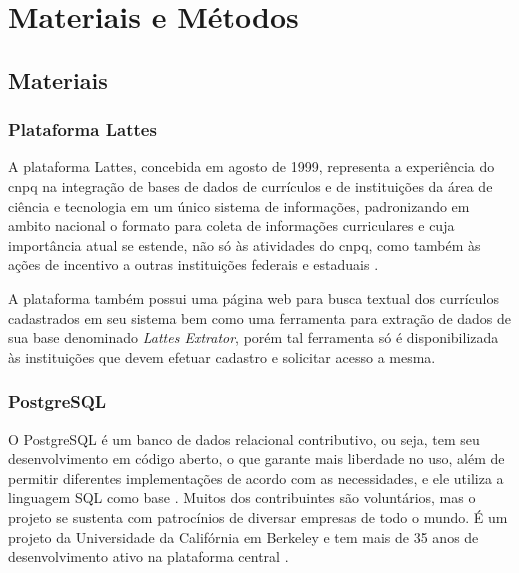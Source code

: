 \chapter{Materiais e Métodos}\label{cap:materialemetodos}

\section{Materiais}\label{sec:materiais}

\subsection{Plataforma Lattes}\label{subsec:lattes}

A plataforma Lattes, concebida em agosto de 1999, representa a experiência do \gls{cnpq} na integração de bases de dados de currículos e de instituições da área de ciência e tecnologia em um único sistema de informações, padronizando em ambito nacional o formato para coleta de informações curriculares e cuja importância atual se estende, não só às atividades do \gls{cnpq}, como também às ações de incentivo a outras instituições federais e estaduais \cite{Lattes}.

A plataforma também possui uma página web para busca textual dos currículos cadastrados em seu sistema bem como uma ferramenta para extração de dados de sua base denominado \textit{Lattes Extrator}, porém tal ferramenta só é disponibilizada às instituições que devem efetuar cadastro e solicitar acesso a mesma.

\subsection{PostgreSQL}\label{subsec:postgresql}

O PostgreSQL é um banco de dados relacional contributivo, ou seja, tem seu desenvolvimento em código aberto, o que garante mais liberdade no uso, além de permitir diferentes implementações de acordo com as necessidades, e ele utiliza a linguagem SQL como base \cite{Amazon}. Muitos dos contribuintes são voluntários, mas o projeto se sustenta com patrocínios de diversar empresas de todo o mundo. É um projeto da Universidade da Califórnia em Berkeley e tem mais de 35 anos de desenvolvimento ativo na plataforma central \cite{PostgreSQL}.

